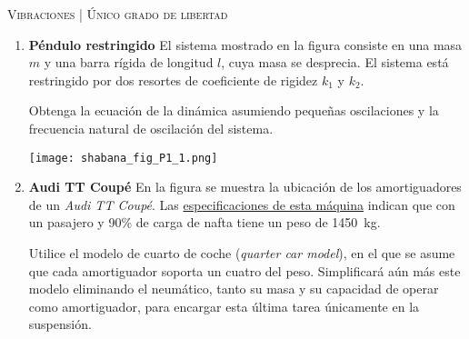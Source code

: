 \documentclass[11pt, spanish, a4paper, twopage]{article}
\begin{document}
\begin{center}
	\textsc{\large Vibraciones | Único grado de libertad}
\end{center}


\begin{enumerate}

				
\item 
\begin{minipage}[t][4cm]{0.65\textwidth}
	\textbf{Péndulo restringido}
	El sistema mostrado en la figura consiste en una masa $m$ y una barra rígida de longitud $l$, cuya masa se desprecia.
	El sistema está restringido por dos resortes de coeficiente de rigidez $k_1$ y $k_2$.

	Obtenga la ecuación de la dinámica asumiendo pequeñas oscilaciones y la frecuencia natural de oscilación del sistema.
\end{minipage}
\begin{minipage}[c][3cm][t]{0.3\textwidth}
	\texttt{[image: shabana\_fig\_P1\_1.png]}
\end{minipage}



\item 
\begin{minipage}[t][6cm]{0.65\textwidth}
	\textbf{Audi TT Coupé}
	En la figura se muestra la ubicación de los amortiguadores de un \emph{Audi TT Coupé}.
	Las \href{https://media.audiusa.com/assets/documents/original/8253-FINAL2021TTTechSpecs.pdf}{especificaciones de esta máquina} indican que con un pasajero y 90\% de carga de nafta tiene un peso de \SI{1450}{\kilo\gram}.

	Utilice el modelo de cuarto de coche (\emph{quarter car model}), en el que se asume que cada amortiguador soporta un cuatro del peso.
	Simplificará aún más este modelo eliminando el neumático, tanto su masa y su capacidad de operar como amortiguador, para encargar esta última tarea únicamente en la suspensión.


\end{minipage}
\end{enumerate}
\end{document}
